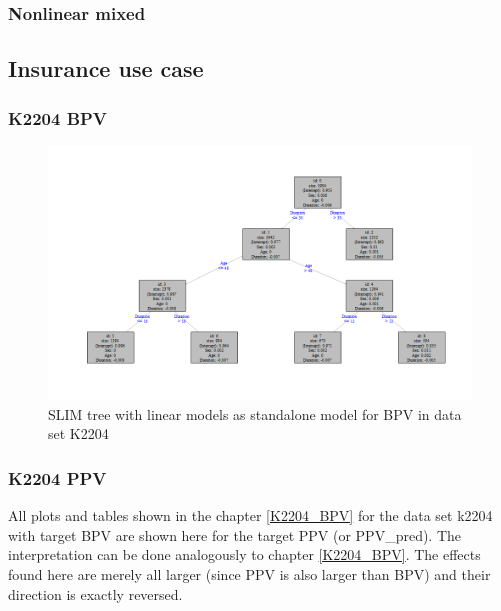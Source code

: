 \subsubsection{Nonlinear mixed}



\clearpage
\subsection{Insurance use case}
\subsubsection{K2204 BPV}

 \begin{figure}[!htb]
     \centering     
     \includegraphics[width = 14cm]{Figures/insurance_use_case/k2204_BPV/slim_lm_tree.png}
     \caption{SLIM tree with linear models as standalone model for BPV in data set K2204}
     \label{fig:app_ins_slim_lm_standalone_tree}
 \end{figure}




\subsubsection{K2204 PPV}
All plots and tables shown in the chapter \ref{K2204_BPV} for the data set k2204 with target BPV are shown here for the target PPV (or PPV\_pred). The interpretation can be done analogously to chapter \ref{K2204_BPV}. The effects found here are merely all larger (since PPV is also larger than BPV) and their direction is exactly reversed. 

